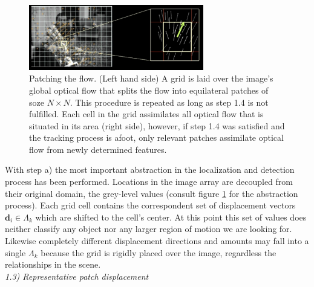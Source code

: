 \begin{figure}
	\begin{center}
		\includegraphics[width=3in]{imgs/method/step1to4.pdf}
		\caption[Patching the flow. ]{Patching the flow. (Left hand side) A grid is laid over the image's global optical flow that splits the flow into equilateral patches of soze $N \times N$. This procedure is repeated as long as step 1.4 is not fulfilled. Each cell in the grid assimilates all optical flow that is situated in its area (right side), however, if step 1.4 was satisfied and the tracking process is afoot, only relevant patches assimilate optical flow from newly determined features.}
		\label{fig:abstraction}
	\end{center}
\end{figure}
%
With step a) the most important abstraction in the localization and detection process has been performed. Locations in the image array are decoupled from their original domain, the grey-level values (consult figure \ref{fig:abstraction} for the abstraction process). Each grid cell contains the correspondent set of displacement vectors $ \mathbf{d}_i \in \Lambda_k $ which are shifted to the cell's center. At this point this set of values does neither classify any object nor any larger region of motion we are looking for. Likewise completely different displacement directions and amounts may fall into a single $\Lambda_k$ because the grid is rigidly placed over the image, regardless the relationships in the scene.\\ \newline
%
\textit{1.3) Representative patch displacement} \newline
